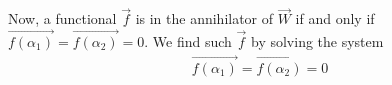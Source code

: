Now, a functional $\vec{f}$ is in the annihilator of $\vec{W}$ if and only if $\vec{f(\alpha_1)} = \vec{f(\alpha_2)} = 0$. We find such $\vec{f}$ by solving the system 
\begin{align}
\vec{f(\alpha_1)} = \vec{f(\alpha_2)} = 0 \label{eq:solutions/3/5/7/4}
\end{align}

